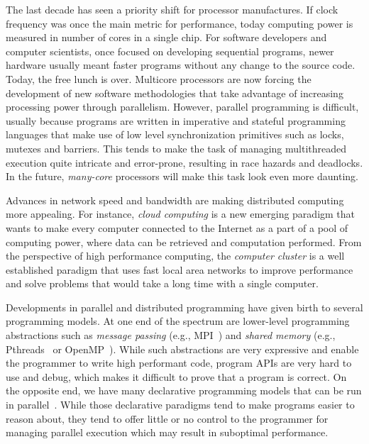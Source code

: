 
The last decade has seen a priority shift for processor manufactures. If clock
frequency was once the main metric for performance, today computing power is
measured in number of cores in a single chip.  For software developers and
computer scientists, once focused on developing sequential programs, newer
hardware usually meant faster programs without any change to the source code.
Today, the free lunch is over. Multicore processors are now forcing the
development of new software methodologies that take advantage of increasing
processing power through parallelism.  However, parallel programming is
difficult, usually because programs are written in imperative and stateful
programming languages that make use of low level synchronization primitives such
as locks, mutexes and barriers. This tends to make the task of managing
multithreaded execution quite intricate and error-prone, resulting in race
hazards and deadlocks.  In the future, \emph{many-core} processors will make
this task look even more daunting.

Advances in network speed and bandwidth are making distributed computing more
appealing. For instance, \emph{cloud computing} is a new emerging paradigm that
wants to make every computer connected to the Internet as a part of a pool of
computing power, where data can be retrieved and computation performed. From the
perspective of high performance computing, the \emph{computer cluster} is a well
established paradigm that uses fast local area networks to improve performance
and solve problems that would take a long time with a single computer.

Developments in parallel and distributed programming have given birth to several
programming models.  At one end of the spectrum are lower-level programming
abstractions such as \emph{message passing} (e.g.,
MPI~\cite{gabriel04-open-mpi}) and \emph{shared memory} (e.g.,
Pthreads~\cite{Butenhof:1997:PPT:263953} or
OpenMP~\cite{Chapman-2007-UOP-1370966}).  While such abstractions are
very expressive and enable the programmer to write high performant code,
program APIs are very hard to use and debug, which makes it difficult to
prove that a program is correct.  On the opposite end, we have many
declarative programming models that can be run in
parallel~\cite{Blelloch:1996:PPA:227234.227246}.  While those declarative
paradigms tend to make programs easier to reason about, they tend to offer
little or no control to the programmer for managing parallel execution
which may result in suboptimal performance.

